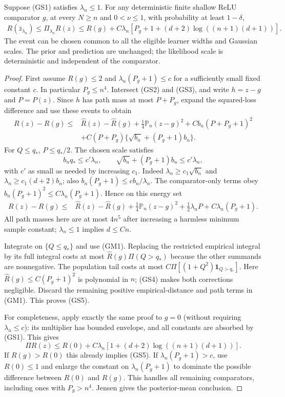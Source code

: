 \begin{theorem}
\label{thm:general-shallow-sharp}
Suppose (GS1) satisfies $\lambda_n\le1$. For any deterministic finite
shallow ReLU comparator $g$, at every $N\ge n$ and $0<\nu\le1$,
with probability at least $1-\delta$,
\begin{align}
 R(\bar z_{\lambda_n})\le\Pi_{\lambda_n}R(z)
 \le R(g)+C\lambda_n\left[
 P_g+1+(d+2)\log((n+1)(d+1))\right].                     \tag{GS5}
\end{align}
The event can be chosen common to all the eligible learner widths
and Gaussian scales. The prior and prediction are unchanged; the
likelihood scale is deterministic and independent of the comparator.
\end{theorem}
\begin{proof}
First assume $R(g)\le2$ and $\lambda_n(P_g+1)\le c$ for a sufficiently
small fixed constant $c$. In particular $P_g\le n^4$.
Intersect (GS2) and (GS3), and write $h=z-g$ and $P=P(z)$.
Since $h$ has path mass at most $P+P_g$, expand the squared-loss
difference and use these events to obtain
\begin{align*}
 R(z)-R(g)\le{}&\widehat R(z)-\widehat R(g)
       +\tfrac14\mathbb P_n(z-g)^2+C b_n(P+P_g+1)^2\\
       &+C(P+P_g)\{\sqrt{b_n}+(P_g+1)b_n\}.
\end{align*}
For $Q\le q_*$, $P\le q_*/2$. The chosen scale satisfies
\[
 b_nq_*\le c'\lambda_n,\qquad
 \sqrt{b_n}+(P_g+1)b_n\le c'\lambda_n,
\]
with $c'$ as small as needed by increasing $c_1$.
Indeed $\lambda_n\ge c_1\sqrt{b_n}$ and
$\lambda_n\ge c_1(d+2)b_n$; also
$b_n(P_g+1)\le c b_n/\lambda_n$.
The comparator-only terms obey
$b_n(P_g+1)^2\le C\lambda_n(P_g+1)$.
Hence on this energy set
\begin{align*}
 R(z)-R(g)\le{}&\widehat R(z)-\widehat R(g)
       +\tfrac14\mathbb P_n(z-g)^2
       +\tfrac12\lambda_n P+C\lambda_n(P_g+1).
\end{align*}
All path masses here are at most $4n^5$ after increasing a harmless
minimum sample constant; $\lambda_n\le1$ implies $d\le Cn$.

Integrate on $\{Q\le q_*\}$ and use (GM1).
Replacing the restricted empirical integral by its full integral
costs at most $\widehat R(g)\Pi(Q>q_*)$ because the other summands
are nonnegative. The population tail costs at most
$C\Pi[(1+Q^2)\mathbf1_{Q>q_*}]$.
Here $\widehat R(g)\le C(P_g+1)^2$ is polynomial in $n$; (GS4)
makes both corrections negligible. Discard the remaining positive
empirical-distance and path terms in (GM1). This proves (GS5).

For completeness, apply exactly the same proof to $g=0$ (without
requiring $\lambda_n\le c$): its multiplier has bounded envelope,
and all constants are absorbed by (GS1). This gives
\[
 \Pi R(z)\le R(0)+C\lambda_n[1+(d+2)\log((n+1)(d+1))].
\]
If $R(g)>R(0)$ this already implies (GS5).
If $\lambda_n(P_g+1)>c$, use $R(0)\le1$ and enlarge the constant
on $\lambda_n(P_g+1)$ to dominate the possible difference between
$R(0)$ and $R(g)$. This handles all remaining comparators, including
ones with $P_g>n^4$. Jensen gives the posterior-mean conclusion.
\end{proof}

